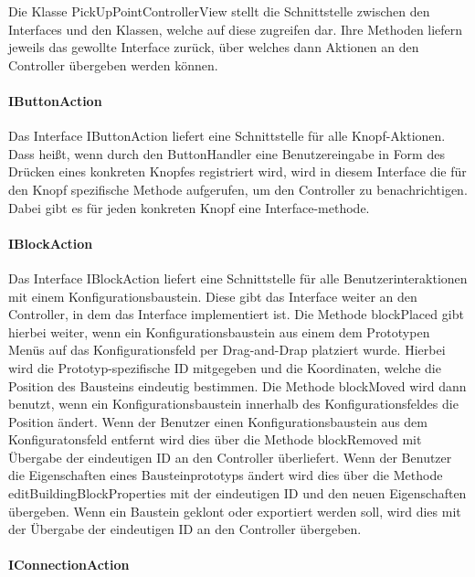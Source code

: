 \documentclass[parskip=full]{scrartcl}
\begin{document}
Die Klasse PickUpPointControllerView stellt die Schnittstelle zwischen den Interfaces und den Klassen, welche auf diese zugreifen dar. Ihre Methoden liefern jeweils das gewollte Interface zurück, über welches dann Aktionen an den Controller übergeben werden können.

\paragraph{IButtonAction}

Das Interface IButtonAction liefert eine Schnittstelle für alle Knopf-Aktionen. Dass heißt, wenn durch den ButtonHandler eine Benutzereingabe in Form des Drücken eines konkreten Knopfes registriert wird, wird in diesem Interface die für den Knopf spezifische Methode aufgerufen, um den Controller zu benachrichtigen. Dabei gibt es für jeden konkreten Knopf eine Interface-methode.

\paragraph{IBlockAction}

Das Interface IBlockAction liefert eine Schnittstelle für alle Benutzerinteraktionen mit einem Konfigurationsbaustein. Diese gibt das Interface weiter an den Controller, in dem das Interface implementiert ist. Die Methode blockPlaced gibt hierbei weiter, wenn ein Konfigurationsbaustein aus einem dem Prototypen Menüs auf das Konfigurationsfeld per Drag-and-Drap platziert wurde. Hierbei wird die Prototyp-spezifische ID mitgegeben und die Koordinaten, welche die Position des Bausteins eindeutig bestimmen. Die Methode blockMoved wird dann benutzt, wenn ein Konfigurationsbaustein innerhalb des Konfigurationsfeldes die Position ändert. Wenn der Benutzer einen Konfigurationsbaustein aus dem Konfiguratonsfeld entfernt wird dies über die Methode blockRemoved mit Übergabe der eindeutigen ID an den Controller überliefert. Wenn der Benutzer die Eigenschaften eines Bausteinprototyps ändert wird dies über die Methode editBuildingBlockProperties mit der eindeutigen ID und den neuen Eigenschaften übergeben. Wenn ein Baustein geklont oder exportiert werden soll, wird dies mit der Übergabe der eindeutigen ID an den Controller übergeben.

\paragraph{IConnectionAction}
\end{document}
